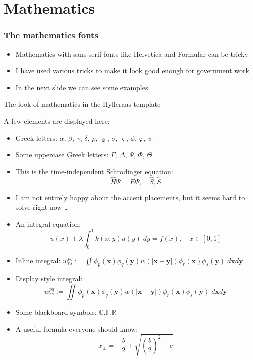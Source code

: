 \documentclass[8pt]{beamer} %
\begin{document}
\section{Mathematics}


\begin{frame}\frametitle{The mathematics fonts}
  \begin{itemize}
    \item Mathematics with sans serif fonts like Helvetica and Formular can be tricky
    \item I have used various tricks to make it look good enough for government work
    \item In the next slide we can see some examples
  \end{itemize}
\end{frame}

\begin{frame}{The look of mathematics in the Hylleraas template}

A few elements are displayed here:
\begin{itemize}
\item Greek letters: $\alpha$, $\beta$, $\gamma$, $\delta$, $\rho$, $\varrho$, $\sigma$, $\varsigma$, $\phi$, $\varphi$, $\psi$
\item Some uppercase Greek letters: $\Gamma$, $\Delta$, $\Psi$, $\Phi$, $\Theta$
\item This is the time-independent Schrödinger equation:
\[ \hat{H} \Psi = E\Psi, \quad \hat{S}, \tilde{S} \]
\item I am not entirely happy about the accent placements, but it seems hard to solve right now \ldots
\item An integral equation:
  \[ u(x) + \lambda \int_0^1 k(x,y) u(y) \; dy = f(x), \quad x \in [0,1] \]
\item Inline integral: $w^{pq}_{rs} := \iint \phi_p(\mathbf{x})\phi_q(\mathbf{y})w(|\mathbf{x}-\mathbf{y}|) \phi_r(\mathbf{x})\phi_s(\mathbf{y})\; d\mathbf{x}d\mathbf{y}$
\item Display style integral:
\[ w^{pq}_{rs} := \iint \phi_p(\mathbf{x})\phi_q(\mathbf{y})w(|\mathbf{x}-\mathbf{y}|) \phi_r(\mathbf{x})\phi_s(\mathbf{y})\; d\mathbf{x}d\mathbf{y} \]
\item Some blackboard symbols: $\mathbb{C}$,$\mathbb{F}$,$\mathbb{R}$
\item A useful formula everyone should know:
\[ x_{\pm} = -\frac{b}{2} \pm \sqrt{\left(\frac{b}{2}\right)^2 - c} \]
\end{itemize}

\end{frame}
\end{document}
